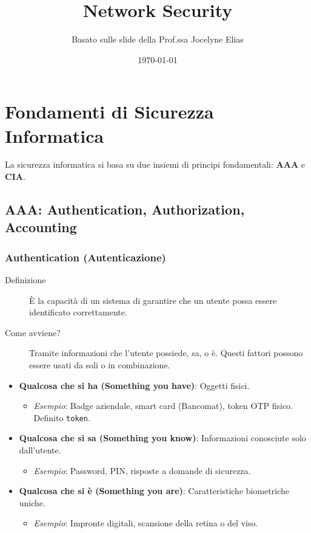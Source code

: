 

\title{Network Security}
\author{Basato sulle slide della Prof.ssa Jocelyne Elias}
\date{\today}



\maketitle
\tableofcontents
\newpage

\section{Fondamenti di Sicurezza Informatica}
La sicurezza informatica si basa su due insiemi di principi fondamentali: \textbf{AAA} e \textbf{CIA}.

\subsection{AAA: Authentication, Authorization, Accounting}

\subsubsection{Authentication (Autenticazione)}
\begin{description}
    \item[Definizione] È la capacità di un sistema di garantire che un utente possa essere identificato correttamente.
    \item[Come avviene?] Tramite informazioni che l'utente possiede, sa, o è. Questi fattori possono essere usati da soli o in combinazione.
\end{description}

\begin{itemize}
    \item \textbf{Qualcosa che si ha (Something you have)}: Oggetti fisici.
        \begin{itemize}
            \item \textit{Esempio}: Badge aziendale, smart card (Bancomat), token OTP fisico. Definito \texttt{token}.
        \end{itemize}
    \item \textbf{Qualcosa che si sa (Something you know)}: Informazioni conosciute solo dall'utente.
        \begin{itemize}
            \item \textit{Esempio}: Password, PIN, risposte a domande di sicurezza.
        \end{itemize}
    \item \textbf{Qualcosa che si è (Something you are)}: Caratteristiche biometriche uniche.
        \begin{itemize}
            \item \textit{Esempio}: Impronte digitali, scansione della retina o del viso.
        \end{itemize}
\end{itemize}


